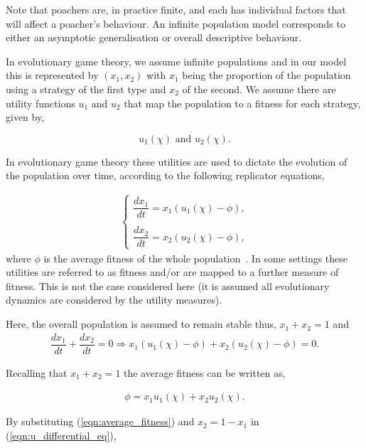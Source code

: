 \documentclass[10pt]{article}
\begin{document}
Note that poachers are, in practice finite, and each has individual factors that will
affect a poacher's behaviour. An infinite population model corresponds to either
an asymptotic generalisation or overall descriptive behaviour.

In evolutionary game theory, we assume infinite populations and in our
model this is represented by \((x_1, x_2)\) with \(x_1\) being the proportion
of the population using a strategy of the first type and \(x_2\) of the second. We
assume there are utility functions \(u_1\) and \(u_2\) that map the population
to a fitness for each strategy, given by,

\[ u_1(\chi)  \text{ and } u_2(\chi).\]

In evolutionary game theory these utilities are used to dictate the evolution of
the population over time, according to the following replicator equations,

\begin{eqnarray}
    \label{eqn:u_differential_eq}
    \left\{
    \begin{array}{cl}
    \dfrac{dx_1}{dt}=x_1(u_1(\chi)-\phi),
    \\
    \\
    \dfrac{dx_2}{dt}= x_2(u_2(\chi)-\phi),
    \end{array} \right.
\end{eqnarray}
where \(\phi\) is the average fitness of the whole population~\cite{nowak2006evolutionary}.
In some settings these utilities are referred to as fitness and/or are mapped to
a further measure of fitness. This is not the case considered here (it is
assumed all evolutionary dynamics are considered by the utility measures).

Here, the overall
population is assumed to remain stable thus, \(x_1 + x_2 = 1 \) and
\begin{eqnarray}
    \dfrac{dx_1}{dt}  + \dfrac{dx_2}{dt} = 0 \Rightarrow x_1(u_1(\chi) - \phi)
     + x_2(u_2(\chi) - \phi)=0.
\end{eqnarray}

Recalling that \(x_1 + x_2 = 1\) the average fitness can be written as,

\begin{eqnarray}
\label{eqn:average_fitness}
    \phi=x_1u_1(\chi) + x_2u_2(\chi).
\end{eqnarray}

\noindent{} By substituting (\ref{eqn:average_fitness}) and \(x_2= 1 - x_1\)
in (\ref{eqn:u_differential_eq}),
\end{document}
